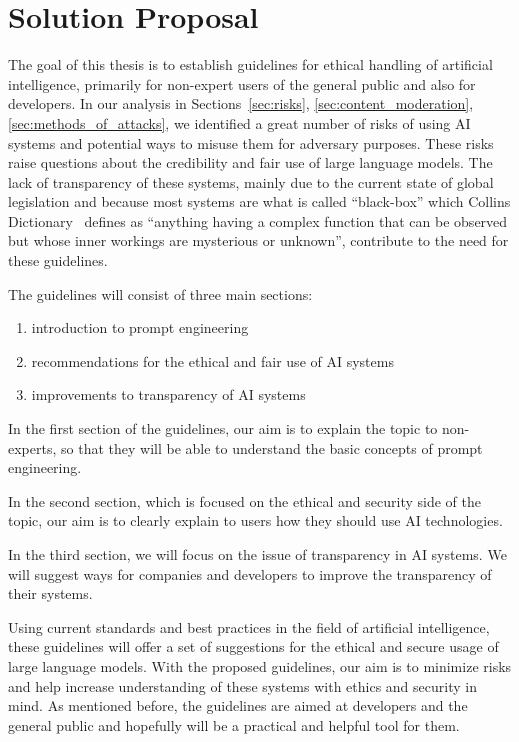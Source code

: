 \chapter{Solution Proposal}

The goal of this thesis is to establish guidelines for ethical handling of artificial intelligence, primarily for non-expert users of the general public and also for developers. In our analysis in Sections~\ref{sec:risks}, \ref{sec:content_moderation}, \ref{sec:methods_of_attacks}, we identified a great number of risks of using AI systems and potential ways to misuse them for adversary purposes. These risks raise questions about the credibility and fair use of large language models. The lack of transparency of these systems, mainly due to the current state of global legislation and because most systems are what is called ``black-box'' which Collins Dictionary~\cite{Collins_BlackBox} defines as ``anything having a complex function that can be observed but whose inner workings are mysterious or unknown'', contribute to the need for these guidelines.

The guidelines will consist of three main sections:
\begin{enumerate}
    \item introduction to prompt engineering
    \item recommendations for the ethical and fair use of AI systems
    \item improvements to transparency of AI systems %
\end{enumerate}

In the first section of the guidelines, our aim is to explain the topic to non-experts, so that they will be able to understand the basic concepts of prompt engineering.

In the second section, which is focused on the ethical and security side of the topic, our aim is to clearly explain to users how they should use AI technologies.

In the third section, we will focus on the issue of transparency in AI systems. We will suggest ways for companies and developers to improve the transparency of their systems.

Using current standards and best practices in the field of artificial intelligence, these guidelines will offer a set of suggestions for the ethical and secure usage of large language models. With the proposed guidelines, our aim is to minimize risks and help increase understanding of these systems with ethics and security in mind. As mentioned before, the guidelines are aimed at developers and the general public and hopefully will be a practical and helpful tool for them.
